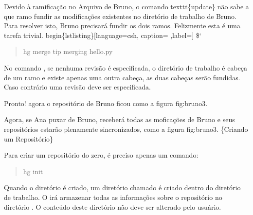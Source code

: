 \documentclass[a4paper,10pt,brazil]{sphinxmanual}
\begin{document}
Devido à ramificação no Arquivo de Bruno, o comando texttt\{update\} não sabe a que ramo fundir as modificações existentes no diretório de trabalho de Bruno. Para resolver isto, Bruno precisará fundir os dois ramos. Felizmente esta é uma tarefa trivial.
begin\{lstlisting\}{[}language=csh, caption= ,label={]}
\${}`
\begin{quote}

hg merge tip merging hello.py
\end{quote}

No comando , se nenhuma revisão é especificada, o
diretório de trabalho é cabeça de um ramo e existe apenas uma outra
cabeça, as duas cabeças serão fundidas. Caso contrário uma revisão
deve ser especificada.

Pronto! agora o repositório de Bruno ficou como a figura
fig:bruno3.

Agora, se Ana puxar de Bruno, receberá todas as moficações de Bruno
e seus repositórios estarão plenamente sincronizados, como a figura
fig:bruno3. \{Criando um Repositório\}

Para criar um repositório do zero, é preciso apenas um comando:
\begin{quote}

hg init
\end{quote}

Quando o diretório é criado, um diretório chamado  é criado
dentro do diretório de trabalho. O  irá armazenar
todas as informações sobre o repositório no diretório . O
conteúdo deste diretório não deve ser alterado pelo usuário.
\end{document}
